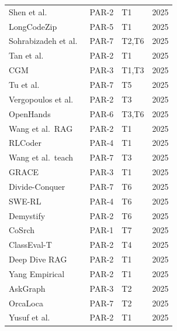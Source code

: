 \begin{longtable}{p{5cm}p{1.2cm}p{1.5cm}r}
Shen et al.~\cite{shen2025repository}             & PAR-2 & T1       & 2025 \\
LongCodeZip~\cite{shi2025longcodezip}             & PAR-5 & T1       & 2025 \\
Sohrabizadeh et al.~\cite{sohrabizadeh2025nemotron}& PAR-7 & T2,T6   & 2025 \\
Tan et al.~\cite{tan2025prompt}                   & PAR-2 & T1       & 2025 \\
CGM~\cite{tao2025cgm}                            & PAR-3 & T1,T3    & 2025 \\
Tu et al.~\cite{tu2025trace}                     & PAR-7 & T5       & 2025 \\
Vergopoulos et al.~\cite{vergopoulos2025automated}& PAR-2 & T3       & 2025 \\
OpenHands~\cite{wang2025openhands}               & PAR-6 & T3,T6    & 2025 \\
Wang et al.\ RAG~\cite{wang2025ragvsft}           & PAR-2 & T1       & 2025 \\
RLCoder~\cite{wang2025rlcoder}                   & PAR-4 & T1       & 2025 \\
Wang et al.\ teach~\cite{wang2025teaching}        & PAR-7 & T3       & 2025 \\
GRACE~\cite{wang2025grace}                       & PAR-3 & T1       & 2025 \\
Divide-Conquer~\cite{wang2025divide}             & PAR-7 & T6       & 2025 \\
SWE-RL~\cite{wei2025swerl}                       & PAR-4 & T6       & 2025 \\
Demystify~\cite{xia2025demystifying}             & PAR-2 & T6       & 2025 \\
CoSrch~\cite{xu2025cosrch}                       & PAR-1 & T7       & 2025 \\
ClassEval-T~\cite{xue2025classevalt}             & PAR-2 & T4       & 2025 \\
Deep Dive RAG~\cite{yang2025deepdive}            & PAR-2 & T1       & 2025 \\
Yang Empirical~\cite{yang2025empirical}           & PAR-2 & T1       & 2025 \\
AskGraph~\cite{yang2025askgraph}                 & PAR-3 & T2       & 2025 \\
OrcaLoca~\cite{yu2025orcaloca}                   & PAR-7 & T2       & 2025 \\
Yusuf et al.~\cite{yusuf2025beyond}              & PAR-2 & T1       & 2025 \\

\end{longtable}
